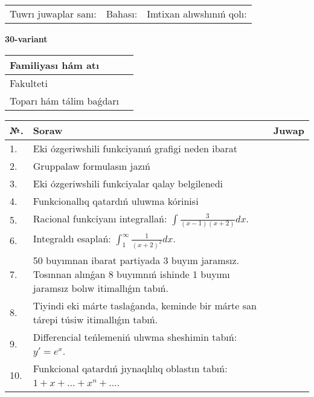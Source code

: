\documentclass{article}
\begin{document}
\vspace{1cm}

\begin{tabular}{ c c c }
Tuwrı juwaplar sanı: \underline{\hspace{2cm}} & Bahası: \underline{\hspace{2cm}} & Imtixan alıwshınıń qolı: \underline{\hspace{2cm}} \\
\end{tabular}

\newpage

\begin{center}\textbf{30-variant}\end{center}

\bgroup
\def\arraystretch{1.5}
\begin{tabular}{ |m{6cm}|m{10cm}| }
  \hline
  Familiyası hám atı & \\
  \hline
  Fakulteti &\\
  \hline
  Toparı hám tálim baǵdarı & \\
  \hline
\end{tabular}
\egroup

\vspace{0.5cm}

\bgroup
\def\arraystretch{2}
\begin{tabular}{ |l|m{8cm}|m{7cm}| }
  \hline
  №. & Soraw & Juwap \\
  \hline
  1. & Eki ózgeriwshili funkciyanıń grafigi neden ibarat &  \\
  \hline
  2. & Gruppalaw formulasın jazıń &  \\
  \hline
  3. & Eki ózgeriwshili funkciyalar qalay belgilenedi &  \\
  \hline
  4. & Funkcionallıq qatardıń uluwma kórinisi &  \\
  \hline
  5. & Racional funkciyanı integrallań: $\displaystyle\int {\frac{3}{(x - 1)(x + 2)}dx}$. &  \\
  \hline
  6. & Integraldı esaplań: $\displaystyle\int_{1}^{\infty}{\frac{1}{\left( x + 2 \right)^{2}}dx }$. &  \\
  \hline
  7. & 50 buyımnan ibarat partiyada 3 buyım jaramsız. Tosınnan alınǵan 8 buyımnıń ishinde 1 buyımı jaramsız bolıw itimallıǵın tabıń. &  \\
  \hline
  8. & Tiyindi eki márte taslaǵanda, keminde bir márte san tárepi túsiw itimallıǵın tabıń. &  \\
  \hline
  9. & Differencial teńlemeniń ulıwma sheshimin tabıń: $y'=e^{x}$. &  \\
  \hline
  10. & Funkcional qatardıń jıynaqlılıq oblastın tabıń: $1 + x + \ldots + x^{n} + \ldots$. &  \\
  \hline
\end{tabular}
\egroup
\end{document}
